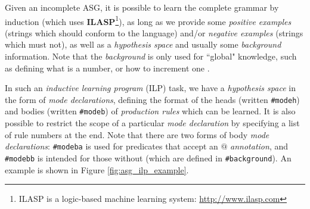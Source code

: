 Given an incomplete ASG, it is possible to learn the complete grammar by induction (which uses \textbf{ILASP}\footnote{ILASP is a logic-based machine learning system: \url{http://www.ilasp.com}}), as long as we provide some \textit{positive examples} (strings which should conform to the language) and/or \textit{negative examples}  (strings which must not), as well as a \textit{hypothesis space} and usually some \textit{background} information. Note that the \textit{background} is only used for ``global" knowledge, such as defining what is a number, or how to increment one \cite{law_representing_2019}.

In such an \textit{inductive learning program} (ILP) task, we have a \textit{hypothesis space} in the form of \textit{mode declarations}, defining the format of the heads (written \texttt{\#modeh}) and bodies (written \texttt{\#modeb}) of \textit{production rules} which can be learned. It is also possible to restrict the scope of a particular \textit{mode declaration} by specifying a list of rule numbers at the end. Note that there are two forms of body \textit{mode declarations}: \texttt{\#modeba} is used for predicates that accept an $@$ \textit{annotation}, and \texttt{\#modebb} is intended for those without (which are defined in \texttt{\#background}). An example is shown in Figure \ref{fig:asg_ilp_example}.

